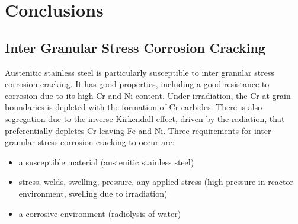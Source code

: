 \chapter{Conclusions}
\label{chapter:conclusions}

\begin{changemargin}{1.0cm}{1.0cm}
\end{changemargin}






\section{Inter Granular Stress Corrosion Cracking}

Austenitic stainless steel is particularly susceptible to inter granular stress corrosion cracking.  It has good properties, including a good resistance to corrosion due to its high Cr and Ni content.  Under irradiation, the Cr at grain boundaries is depleted with the formation of Cr carbides.  There is also segregation due to the inverse Kirkendall effect, driven by the radiation, that preferentially depletes \Gls{Cr} leaving \Gls{Fe} and \Gls{Ni}. Three requirements for inter granular stress corrosion cracking to occur are:

\begin{itemize}
\item a susceptible material (austenitic stainless steel)
\item stress, welds, swelling, pressure, any applied stress (high pressure in reactor environment, swelling due to irradiation)
\item a corrosive environment (radiolysis of water)
\end{itemize}

